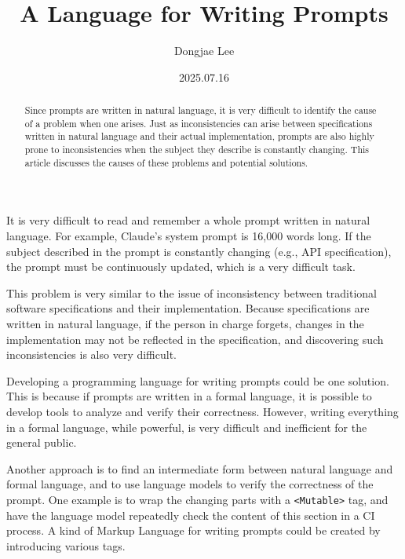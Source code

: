 \documentclass[11pt, oneside]{article}
\title{A Language for Writing Prompts}
\author{Dongjae Lee}
\date{2025.07.16}
\begin{document}
\maketitle

\begin{abstract}
	Since prompts are written in natural language, it is very difficult to identify the cause of a problem when one arises.
	Just as inconsistencies can arise between specifications written in natural language and their actual implementation, prompts are also highly prone to inconsistencies when the subject they describe is constantly changing.
	This article discusses the causes of these problems and potential solutions.
\end{abstract}

It is very difficult to read and remember a whole prompt written in natural language. For example, Claude's system prompt is 16,000 words long.
If the subject described in the prompt is constantly changing (e.g., API specification), the prompt must be continuously updated, which is a very difficult task.

This problem is very similar to the issue of inconsistency between traditional software specifications and their implementation.
Because specifications are written in natural language, if the person in charge forgets, changes in the implementation may not be reflected in the specification, and discovering such inconsistencies is also very difficult.

Developing a programming language for writing prompts could be one solution.
This is because if prompts are written in a formal language, it is possible to develop tools to analyze and verify their correctness.
However, writing everything in a formal language, while powerful, is very difficult and inefficient for the general public.

Another approach is to find an intermediate form between natural language and formal language, and to use language models to verify the correctness of the prompt.
One example is to wrap the changing parts with a \texttt{<Mutable>} tag, and have the language model repeatedly check the content of this section in a CI process.
A kind of Markup Language for writing prompts could be created by introducing various tags.
\end{document}
